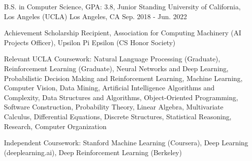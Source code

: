 

\begin{cventries}

  \cventry
    {B.S. in Computer Science, GPA: 3.8, Junior Standing} %
    {University of California, Los Angeles (UCLA)} %
    {Los Angeles, CA} %
    {Sep. 2018 - Jun. 2022} %
    {
      \begin{cvitems} %
        \item {Achievement Scholarship Recipient, Association for Computing Machinery
        (AI Projects Officer), Upsilon Pi Epsilon (CS Honor Society)}
        \item {Relevant UCLA Coursework: Natural Language Processing (Graduate), Reinforcement Learning (Graduate),
        Neural Networks and Deep Learning, Probabilistic Decision Making and Reinforcement 
        Learning, Machine Learning, Computer Vision, Data Mining, Artificial Intelligence
        Algorithms and Complexity, Data Structures and Algorithms, Object-Oriented 
        Programming, Software Construction, Probability Theory, Linear Algebra, 
        Multivariate Calculus, Differential Equations, Discrete Structures, Statistical Reasoning, 
        Research, Computer Organization}
        \item {Independent Coursework: Stanford Machine Learning (Coursera), Deep Learning (deeplearning.ai), Deep Reinforcement Learning (Berkeley)}
      \end{cvitems}
    }

\end{cventries}
